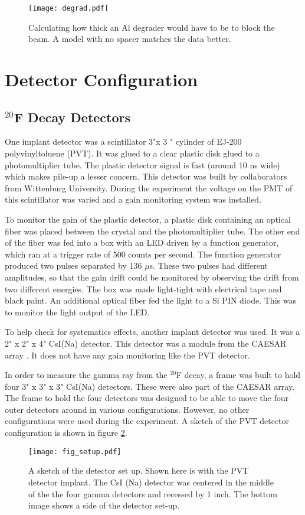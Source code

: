 \documentclass[../MaxHughesThesis.tex]{subfiles}
\begin{document}
\begin{figure}[!htb]
	\centerline{\texttt{[image: degrad.pdf]}}
	\caption{Calculating how thick an Al degrader would have to be to block the beam.
	 	 A model with no spacer matches the data better.}
	\label{fig:lisealcalc}
\end{figure}

\section{Detector Configuration}

\subsection{$^{20}$F Decay Detectors}
One implant detector was a scintillator 3"\diameter x  3 " cylinder of EJ-200 polyvinyltoluene (PVT).
It was glued to a clear plastic disk glued to a photomultiplier tube.
The plastic detector signal is fast (around 10 ns wide) which makes pile-up a lesser concern.
This detector was built by collaborators from Wittenburg University.
During the experiment the voltage on the PMT of this scintillator was varied and a gain monitoring system was installed.

To monitor the gain of the plastic detector, a plastic disk containing an optical fiber was placed between the crystal and the photomultiplier tube. 
The other end of the fiber was fed into a box with an LED driven by a function generator, which ran at a trigger rate of 500 counts per second. 
The function generator produced two pulses separated by 136 $\mu$s.
These two pulses had different amplitudes, so that the gain drift could be monitored by observing the drift from two different energies.
The box was made light-tight with electrical tape and black paint.
An additional optical fiber fed the light to a Si PIN diode.
This was to monitor the light output of the LED.

To help check for systematics effects, another implant detector was used.
It was a 2" x 2" x 4"  CsI(Na) detector. 
This detector was a module from the CAESAR array \cite{Wei10}.
It does not have any gain monitoring like the PVT detector.

In order to measure the gamma ray from the $^{20}$F decay, a frame was built to hold four 3" x 3" x 3" CsI(Na) detectors.  
These were also part of the CAESAR array.
The frame to hold the four detectors was designed to be able to move the four outer detectors around in various configurations.
However, no other configurations were used during the experiment. 
A sketch of the PVT detector configuration is shown in figure \ref{fig:detsketch}.
\begin{figure}
	\centerline{\texttt{[image: fig\_setup.pdf]}}
	\caption{A sketch of the detector set up. 
	Shown here is with the PVT detector implant.
	The CsI (Na) detector was centered in the middle of the the four gamma detectors and recessed by 1 inch.
	The bottom image shows a side of the detector set-up.}
	\label{fig:detsketch}
\end{figure}
\end{document}
